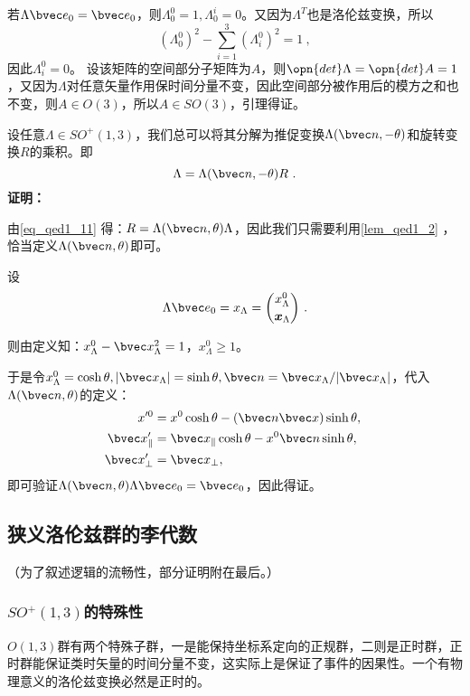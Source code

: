 若$\Lambda \bvec e_0=\bvec e_0$，则$\Lambda^0_0=1,\Lambda^i_0=0$。又因为$\Lambda^T$也是洛伦兹变换，所以
\begin{equation}
(\Lambda^0_0)^2-\sum^{3}_{i=1}(\Lambda^0_i)^2=1~,
\end{equation}
因此$\Lambda^0_i=0$。
设该矩阵的空间部分子矩阵为$A$，则$\opn{det}\Lambda=\opn{det}A=1$，又因为$\Lambda$对任意矢量作用保时间分量不变，因此空间部分被作用后的模方之和也不变，则$A\in O(3)$，所以$A\in SO(3)$，引理得证。
\begin{theorem}{}
设任意$\Lambda\in SO^+(1,3)$，我们总可以将其分解为推促变换$\Lambda(\bvec n,-\theta)$和旋转变换$R$的乘积。即
\begin{equation}\label{eq_qed1_11}
\Lambda=\Lambda(\bvec n,-\theta)R~.
\end{equation}
\textbf{证明：}

由\autoref{eq_qed1_11} 得：$R=\Lambda(\bvec n,\theta)\Lambda$，因此我们只需要利用\autoref{lem_qed1_2} ，恰当定义$\Lambda(\bvec n,\theta)$即可。

设
\begin{equation}
\Lambda \bvec e_{0}=x_{\Lambda}=\binom{x_{\Lambda}^{0}}{\boldsymbol{x}_{\Lambda}}~.
\end{equation}

则由定义知：$x_{\Lambda}^0-\bvec x_{\Lambda}^2=1$，$x_{\Lambda}^0\ge 1$。

于是令$x_{\Lambda}^0=\cosh \theta, |\bvec x_{\Lambda}|=\sinh \theta,\bvec n=\bvec x_{\Lambda}/|\bvec x_{\Lambda}|$，代入$\Lambda(\bvec n,\theta )$的定义：
\begin{equation}
\begin{aligned}
x'^{0}&=x^0\cosh \theta   -(\bvec n\bvec x)\sinh \theta ,\\
\bvec x_{\|}'&=\bvec x_{\|} \cosh \theta - x^0\bvec n \sinh \theta,\\
\bvec x_{\perp}'&=\bvec x_{\perp},
\end{aligned}~
\end{equation}
即可验证$\Lambda(\bvec n,\theta)\Lambda \bvec e_0=\bvec e_0$，因此得证。
\end{theorem}
\subsection{狭义洛伦兹群的李代数}
（为了叙述逻辑的流畅性，部分证明附在最后。）

\subsubsection{$SO^+(1,3)$的特殊性}
$O(1,3)$群有两个特殊子群，一是能保持坐标系定向的正规群，二则是正时群，正时群能保证类时矢量的时间分量不变，这实际上是保证了事件的因果性。一个有物理意义的洛伦兹变换必然是正时的。

